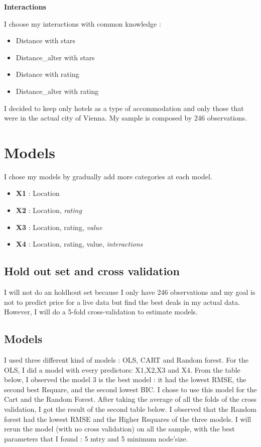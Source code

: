 \documentclass[
]{article}
\begin{document}
\textbf{Interactions}

I choose my interactions with common knowledge :

\begin{itemize}
\item
  Distance with stars
\item
  Distance\_alter with stars
\item
  Distance with rating
\item
  Distance\_alter with rating
\end{itemize}

I decided to keep only hotels as a type of accommodation and only those
that were in the actual city of Vienna. My sample is composed by 246
observations.

\hypertarget{models}{%
\section{Models}\label{models}}

I chose my models by gradually add more categories at each model.

\begin{itemize}
\item
  \textbf{X1} : Location
\item
  \textbf{X2} : Location, \emph{rating}
\item
  \textbf{X3} : Location, rating, \emph{value}
\item
  \textbf{X4} : Location, rating, value, \emph{interactions}
\end{itemize}

\hypertarget{hold-out-set-and-cross-validation}{%
\subsection{Hold out set and cross
validation}\label{hold-out-set-and-cross-validation}}

I will not do an holdhout set because I only have 246 observations and
my goal is not to predict price for a live data but find the best deals
in my actual data. However, I will do a 5-fold cross-validation to
estimate models.

\hypertarget{models-1}{%
\subsection{Models}\label{models-1}}

I used three different kind of models : OLS, CART and Random forest. For
the OLS, I did a model with every predictors: X1,X2,X3 and X4. From the
table below, I observed the model 3 is the best model : it had the
lowest RMSE, the second best Rsquare, and the second lowest BIC. I chose
to use this model for the Cart and the Random Forest. After taking the
average of all the folds of the cross validation, I got the result of
the second table below. I observed that the Random forest had the lowest
RMSE and the Higher Rsquares of the three models. I will rerun the model
(with no cross validation) on all the sample, with the best parameters
that I found : 5 mtry and 5 minimum node'size.
\end{document}
